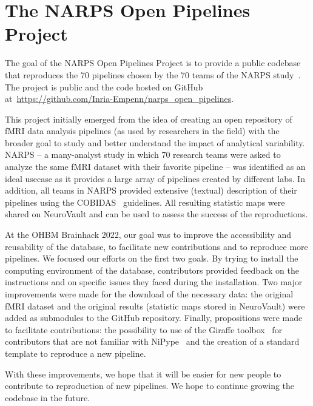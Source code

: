 \documentclass[../main.tex]{subfiles}
\begin{document}
\section{The NARPS Open Pipelines Project}




The goal of the NARPS Open Pipelines Project is to provide a public codebase that reproduces the 70 pipelines chosen by the 70 teams of the NARPS study~\parencite{botviniknezer2020}. The project is public and the code hosted on GitHub at~\url{https://github.com/Inria-Empenn/narps_open_pipelines}.

This project initially emerged from the idea of creating an open repository of fMRI data analysis pipelines (as used by researchers in the field) with the broader goal to study and better understand the impact of analytical variability. NARPS -- a many-analyst study in which 70 research teams were asked to analyze the same fMRI dataset with their favorite pipeline -- was identified as an ideal usecase as it provides a large array of pipelines created by different labs. In addition, all teams in NARPS provided extensive (textual) description of their pipelines using the COBIDAS~\parencite{nichols2017} guidelines. All resulting statistic maps were shared on NeuroVault \parencite{gorgolewski2015} and can be used to assess the success of the reproductions. 

At the OHBM Brainhack 2022, our goal was to improve the accessibility and reusability of the database, to facilitate new contributions and to reproduce more pipelines. We focused our efforts on the first two goals. By trying to install the computing environment of the database, contributors provided feedback on the instructions and on specific issues they faced during the installation. Two major improvements were made for the download of the necessary data: the original fMRI dataset and the original results (statistic maps stored in NeuroVault) were added as submodules to the GitHub repository. Finally, propositions were made to facilitate contributions: the possibility to use of the Giraffe toolbox~\parencite{vanMourik2016} for contributors that are not familiar with NiPype~\parencite{gorgolewski2017} and the creation of a standard template to reproduce a new pipeline. 

With these improvements, we hope that it will be easier for new people to contribute to reproduction of new pipelines. We hope to continue growing the codebase in the future. 

\printbibliography
\end{document}
